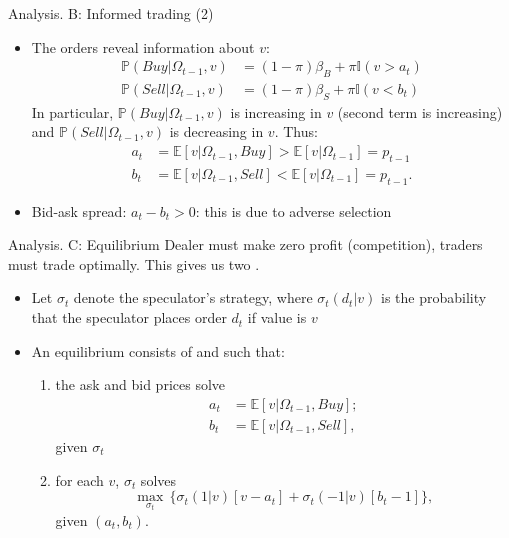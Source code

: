 \begin{frame}{Analysis. B: Informed trading (2)}
	\begin{itemize}
		\item The orders reveal information about $v$:
		\begin{align*}
			\mathbb{P}(Buy|\Omega_{t-1}, v) & = (1-\pi) \beta_B + \pi \mathbb{I}(v>a_t) \\
			\mathbb{P}(Sell|\Omega_{t-1}, v)  & = (1-\pi) \beta_S + \pi \mathbb{I}(v<b_t)
		\end{align*}
		In particular, $\mathbb{P}(Buy|\Omega_{t-1}, v)$ is increasing in $v$ (second term is increasing) and $\mathbb{P}(Sell|\Omega_{t-1}, v)$ is decreasing in $v$. Thus:
		\begin{align*}
			a_t & = \mathbb{E}[v|\Omega_{t-1}, Buy] > \mathbb{E}[v|\Omega_{t-1}] = p_{t-1} \\
			b_t & = \mathbb{E}[v|\Omega_{t-1}, Sell] < \mathbb{E}[v|\Omega_{t-1}] = p_{t-1}.
		\end{align*}
		\item Bid-ask spread: $a_t - b_t >0$: this is due to \alert{adverse selection}
	\end{itemize}
\end{frame}


\begin{frame}{Analysis. C: Equilibrium}
	Dealer must make zero profit ({competition}), traders must trade optimally.
	This gives us two .
	\begin{itemize}
		\item Let $\sigma_t$ denote the speculator's strategy, where $\sigma_t(d_t|v)$ is the probability that the speculator places order $d_t$ if value is $v$
		\item \alert{An equilibrium} consists of  and  such that:
		\begin{enumerate}
			\item the ask and bid prices  solve 
			\begin{align*}
			a_t & = \mathbb{E}[v| \Omega_{t-1}, Buy]; \\
			b_t & = \mathbb{E}[v| \Omega_{t-1}, Sell],
			\end{align*}
			given $\sigma_t$
			\item for each $v$, $\sigma_t$ solves 
			\[
			\max_{\sigma_t } \, \{\sigma_t(1|v) [v-a_t] + \sigma_t(-1|v)[b_t-1] \},
			\]
			given $(a_t,b_t)$.
		\end{enumerate} 
	\end{itemize}
\end{frame}


